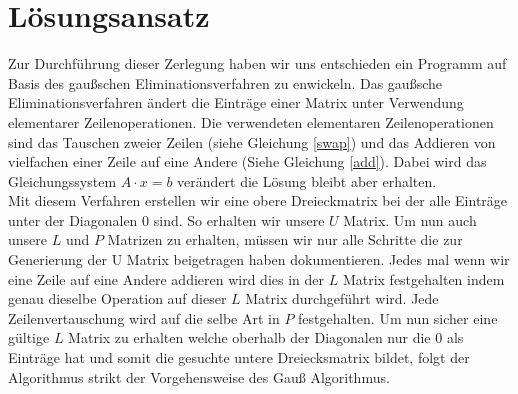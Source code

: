 \documentclass[course=erap]{aspdoc}
\begin{document}
 



\section{Lösungsansatz}
Zur Durchführung dieser Zerlegung haben wir uns entschieden ein Programm auf Basis des gaußschen Eliminationsverfahren zu enwickeln.
Das gaußsche Eliminationsverfahren ändert die Einträge einer Matrix unter Verwendung elementarer Zeilenoperationen.
Die verwendeten elementaren Zeilenoperationen sind das Tauschen zweier Zeilen (siehe Gleichung \ref{swap}) und das Addieren von
vielfachen einer Zeile auf eine Andere (Siehe Gleichung \ref{add}). 
 Dabei wird das Gleichungssystem $A \cdot x = b$ verändert die Lösung bleibt aber erhalten.\\

Mit diesem Verfahren erstellen wir eine obere Dreieckmatrix bei der alle Einträge unter der 
Diagonalen 0 sind. So erhalten wir unsere $U$ Matrix. Um nun auch unsere $L$ und $P$ Matrizen zu erhalten, müssen
wir nur alle Schritte die zur Generierung der U Matrix beigetragen haben dokumentieren. Jedes mal wenn wir eine Zeile auf eine Andere addieren
wird dies in der $L$ Matrix festgehalten indem genau dieselbe Operation auf dieser $L$ Matrix durchgeführt wird. Jede Zeilenvertauschung wird auf die selbe Art in $P$ festgehalten.  
Um nun sicher eine gültige $L$ Matrix zu erhalten welche oberhalb der Diagonalen nur die 0 als Einträge hat und somit die gesuchte untere Dreiecksmatrix bildet, folgt der Algorithmus strikt der Vorgehensweise des Gauß Algorithmus.\\
\end{document}
